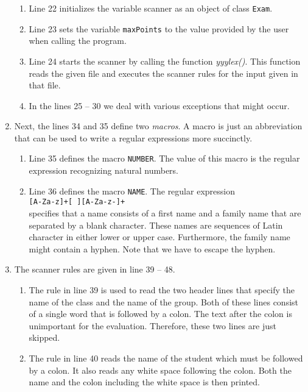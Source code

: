 \begin{enumerate}
\begin{enumerate}
      \item Line 22 initializes the variable scanner as an object of class \texttt{Exam}.
      \item Line 23 sets the variable \texttt{maxPoints} to the value provided by the user when
            calling the program.
      \item Line 24 starts the scanner by calling the function \textsl{yyylex()}.  This function
            reads the given file and executes the scanner rules for the input given in that file.
      \item In the lines 25 -- 30 we deal with various exceptions that might occur.   
      \end{enumerate}
\item Next, the lines 34 and 35 define two \emph{macros}.  A macro is just an abbreviation that can
      be used to write a regular expressions more succinctly.
      \begin{enumerate}
      \item Line 35 defines the macro  \texttt{NUMBER}.  The value of this macro is the regular
            expression recognizing natural numbers.
      \item Line 36 defines the macro \texttt{NAME}.  The regular expression
            \\[0.2cm]
            \hspace*{1.3cm}
            \texttt{[A-Za-z]+[ ][A-Za-z-]+}
            \\[0.2cm]
            specifies that a name consists of a first name and a family name that are separated by a
            blank character.  These names are sequences of Latin character in either lower or upper
            case.  Furthermore, the family name might contain a hyphen.  Note that we have to escape
            the hyphen.
      \end{enumerate}
\item The scanner rules are given in line 39 -- 48.
      \begin{enumerate}
      \item The rule in line 39 is used to read the two header lines that specify the name of the
            class and the name of the group.
            Both of these lines consist of a single word that is followed by a colon.  The text
            after the colon is unimportant for the evaluation.  Therefore, these two lines are just skipped.
      \item The rule in line 40 reads the name of the student which must be followed by a colon.
            It also reads any white space following the colon.  Both the name and the colon
            including the white space is then printed.


\end{enumerate}
\end{enumerate}

